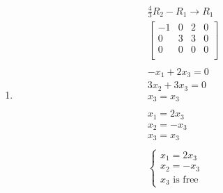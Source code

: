 \documentclass[12pt letter]{report}
\begin{document}
{{\begin{enumerate}
\begin{align*}
\begin{bmatrix}
                3 & 6 & 0 & 0 \\
              \end{bmatrix}
              \\
              3R_1 - R_3  \rightarrow R_3 \\
              \begin{bmatrix}
                1 & 4 & 2 & 0 \\
                0 & 3 & 3 & 0 \\
                0 & 6 & 6 & 0 \\
              \end{bmatrix}
              \\
              2R_2 - R_3  \rightarrow R_3 \\
              \begin{bmatrix}
                1 & 4 & 2 & 0 \\
                0 & 3 & 3 & 0 \\
                0 & 0 & 0 & 0 \\
              \end{bmatrix}
              \\
            \end{align*}
            $\therefore$ The set of vectors $\{\mathbf{v}_1, \mathbf{v}_2, \mathbf{v}_3\} $ is linearly dependent
      \item
            \begin{align*}
              \frac{4}{3}R_2 - R_1  \rightarrow R_1 \\
              \begin{bmatrix}
                -1 & 0 & 2 & 0 \\
                0  & 3 & 3 & 0 \\
                0  & 0 & 0 & 0 \\
              \end{bmatrix}
              \\
              \\
              -x_1 + 2x_3 = 0                       \\
              3x_2 + 3x_3 = 0                       \\
              x_3 = x_3                             \\
              \\
              x_1 = 2x_3                            \\
              x_2 = -x_3                            \\
              x_3 = x_3                             \\
              \\
              \begin{cases}
                x_1 = 2x_3 \\
                x_2 = -x_3 \\
                x_3 \text{ is free}
              \end{cases}
            \end{align*}
    \end{enumerate}
  }
}
\end{document}
